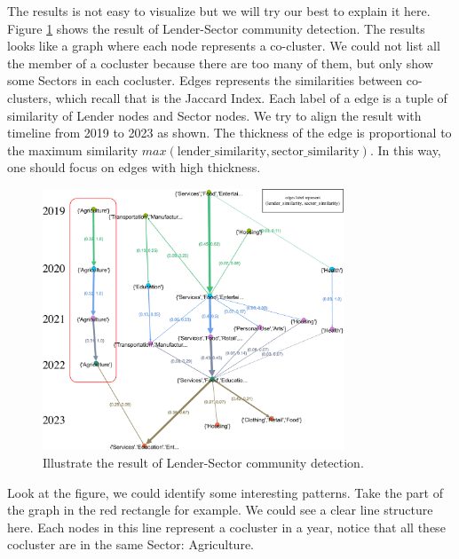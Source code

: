 % 

The results is not easy to visualize but we will try our best to explain it here.
Figure \ref{fig:appendix-LSector} shows the result of Lender-Sector community detection.
The results looks like a graph where each node represents a co-cluster.
We could not list all the member of a cocluster because there are too many of them,
but only show some Sectors in each cocluster.
Edges represents the similarities between co-clusters, which recall that is the Jaccard Index.
Each label of a edge is a tuple of similarity of Lender nodes and Sector nodes.
We try to align the result with timeline from 2019 to 2023 as shown.
The thickness of the edge is proportional to the maximum similarity $max(\text{lender\_similarity}, \text{sector\_similarity})$.
In this way, one should focus on edges with high thickness.

\begin{figure}[H]
	\centering
	\includegraphics[width=0.8\textwidth]{images/LSector.pdf}
	\caption{Illustrate the result of Lender-Sector community detection.}
	\label{fig:appendix-LSector}
\end{figure}

Look at the figure, we could identify some interesting patterns.
Take the part of the graph in the red rectangle for example.
We could see a clear line structure here.
Each nodes in this line represent a cocluster in a year,
notice that all these cocluster are in the same Sector: Agriculture.


